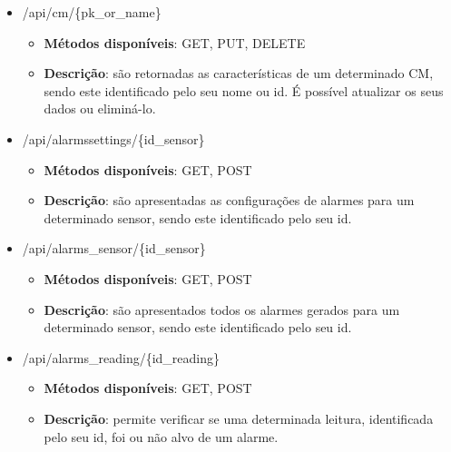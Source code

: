 \begin{itemize}
	
	\item /api/cm/\{pk\_or\_name\}
	\begin{itemize}
		\item \textbf{Métodos disponíveis}: GET, PUT, DELETE
		\item \textbf{Descrição}: são retornadas as características de um determinado \acl{CM}, sendo este identificado pelo seu nome ou id. É possível atualizar os seus dados ou eliminá-lo. 
	\end{itemize}
	
	
	\item /api/alarmssettings/\{id\_sensor\}
	\begin{itemize}
		\item \textbf{Métodos disponíveis}: GET, POST
		\item \textbf{Descrição}: são apresentadas as configurações de alarmes para um determinado sensor, sendo este identificado pelo seu id. 
	\end{itemize}
	
	
	\item /api/alarms\_sensor/\{id\_sensor\}
	\begin{itemize}
		\item \textbf{Métodos disponíveis}: GET, POST
		\item \textbf{Descrição}: são apresentados todos os alarmes gerados para um determinado sensor, sendo este identificado pelo seu id. 
	\end{itemize}
	
	
	\item /api/alarms\_reading/\{id\_reading\}
	\begin{itemize}
		\item \textbf{Métodos disponíveis}:  GET, POST
		\item \textbf{Descrição}: permite verificar se uma determinada leitura, identificada pelo seu id, foi ou não alvo de um alarme. 
	\end{itemize}
	
\end{itemize}

